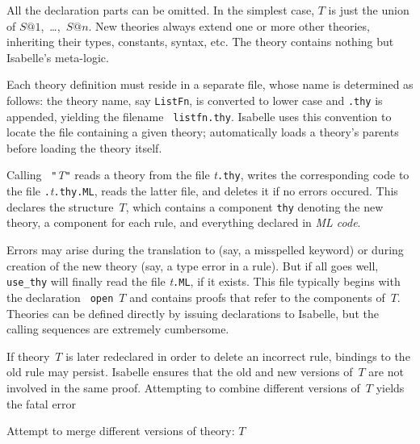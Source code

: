 All the declaration parts can be omitted.  In the simplest case, $T$ is
just the union of $S@1$,~\ldots,~$S@n$.  New theories always extend one
or more other theories, inheriting their types, constants, syntax, etc.
The theory  contains nothing but Isabelle's meta-logic.

Each theory definition must reside in a separate file, whose name is
determined as follows: the theory name, say {\tt ListFn}, is converted to
lower case and {\tt.thy} is appended, yielding the filename {\tt
  listfn.thy}.  Isabelle uses this convention to locate the file containing
a given theory;  automatically loads a theory's
parents before loading the theory itself.

Calling ~{\tt"}{\it T\/}{\tt"} reads a theory from the
file {\it t}{\tt.thy}, writes the corresponding {\ML} code to the file
{\tt.}{\it t}{\tt.thy.ML}, reads the latter file, and deletes it if no errors
occured.  This declares the {\ML} structure~$T$, which contains a component
{\tt thy} denoting the new theory, a component for each rule, and everything
declared in {\it ML code}.

Errors may arise during the translation to {\ML} (say, a misspelled keyword)
or during creation of the new theory (say, a type error in a rule).  But if
all goes well, {\tt use_thy} will finally read the file {\it t}{\tt.ML}, if
it exists.  This file typically begins with the {\ML} declaration {\tt
open}~$T$ and contains proofs that refer to the components of~$T$.
Theories can be defined directly by issuing {\ML} declarations to Isabelle,
but the calling sequences are extremely cumbersome.

If theory~$T$ is later redeclared in order to delete an incorrect rule,
bindings to the old rule may persist.  Isabelle ensures that the old and
new versions of~$T$ are not involved in the same proof.  Attempting to
combine different versions of~$T$ yields the fatal error
\begin{ttbox}
Attempt to merge different versions of theory: \(T\)
\end{ttbox}

